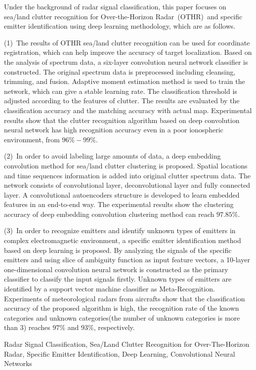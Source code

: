 
\begin{Abstract}
Under the background of radar signal classification, this paper focuses on sea/land clutter recognition for Over-the-Horizon Radar~(OTHR)~and specific emitter identification using deep learning methodology, which are as follows.

(1)~The results of OTHR sea/land clutter recognition can be used for coordinate registration, which can help improve the accuracy of target localization.
Based on the analysis of spectrum data, a six-layer convolution neural network classifier is constructed.
The original spectrum data is preprocessed including cleansing, trimming, and fusion.
Adaptive moment estimation method is used to train the network, which can give a stable learning rate.
The classification threshold is adjusted according to the features of clutter. The results are evaluated by the classification accuracy and the matching accuracy with actual map.
Experimental results show that the clutter recognition algorithm based on deep convolution neural network has high recognition accuracy even in a poor ionospheric environment, from $96\%-99\%$.

(2)~In order to avoid labeling large amounts of data,
a deep embedding convolution method for sea/land clutter clustering is proposed.
Spatial locations and time sequences information is added into original clutter spectrum data.
The network consists of convolutional layer, deconvolutional layer and fully connected layer.
A convolutional autoencoders structure is developed to learn embedded features in an end-to-end way.
The experimental results show the clustering accuracy of deep embedding convolution clustering method can reach $97.85\%$.

(3)~In order to recognize emitters and identify unknown types of emitters in complex electromagnetic environment, a specific emitter identification method based on deep learning is proposed.
By analyzing the signals of the specific emitters and using slice of ambiguity function as input feature vectors,
a 10-layer one-dimensional convolution neural network is constructed as the primary classifier to classify the input signals firstly. Unknown types of emitters are identified by a support vector machine classifier as Meta-Recognition.
Experiments of meteorological radars from aircrafts show that the classification accuracy of the proposed algorithm is high, the recognition rate of the known categories and unknown categories(the number of unknown categories is more than 3) reaches $97\%$ and $93\%$, respectively.

\begin{Keywords}
Radar Signal Classification, Sea/Land Clutter Recognition for Over-The-Horizon Radar, Specific Emitter Identification, Deep Learning, Convolutional Neural Networks
\end{Keywords}
\end{Abstract}
